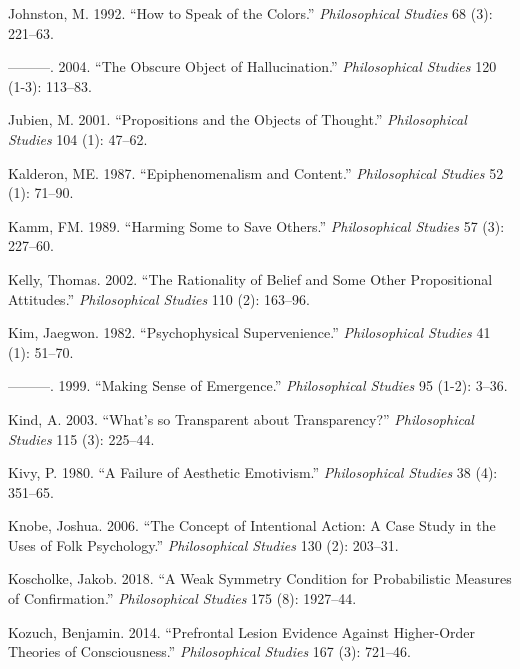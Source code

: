 \documentclass[
  10pt,
  letterpaper,
  DIV=11,
  numbers=noendperiod,
  twoside]{scrartcl}
\newlength{\cslhangindent}
\newenvironment{CSLReferences}[2] %
 {\begin{list}{}{%
  \setlength{\itemindent}{0pt}
  \setlength{\leftmargin}{0pt}
  \setlength{\parsep}{0pt}
  \ifodd #1
   \setlength{\leftmargin}{\cslhangindent}
   \setlength{\itemindent}{-1\cslhangindent}
  \fi
  \setlength{\itemsep}{#2\baselineskip}}}
 {\end{list}}
\begin{document}
\begin{CSLReferences}{1}{0}
Johnston, M. 1992. {``How to Speak of the Colors.''} \emph{Philosophical
Studies} 68 (3): 221--63.

---------. 2004. {``The Obscure Object of Hallucination.''}
\emph{Philosophical Studies} 120 (1-3): 113--83.

Jubien, M. 2001. {``Propositions and the Objects of Thought.''}
\emph{Philosophical Studies} 104 (1): 47--62.

Kalderon, ME. 1987. {``Epiphenomenalism and Content.''}
\emph{Philosophical Studies} 52 (1): 71--90.

Kamm, FM. 1989. {``Harming Some to Save Others.''} \emph{Philosophical
Studies} 57 (3): 227--60.

Kelly, Thomas. 2002. {``The Rationality of Belief and Some Other
Propositional Attitudes.''} \emph{Philosophical Studies} 110 (2):
163--96.

Kim, Jaegwon. 1982. {``Psychophysical Supervenience.''}
\emph{Philosophical Studies} 41 (1): 51--70.

---------. 1999. {``Making Sense of Emergence.''} \emph{Philosophical
Studies} 95 (1-2): 3--36.

Kind, A. 2003. {``What's so Transparent about Transparency?''}
\emph{Philosophical Studies} 115 (3): 225--44.

Kivy, P. 1980. {``A Failure of Aesthetic Emotivism.''}
\emph{Philosophical Studies} 38 (4): 351--65.

Knobe, Joshua. 2006. {``The Concept of Intentional Action: A Case Study
in the Uses of Folk Psychology.''} \emph{Philosophical Studies} 130 (2):
203--31.

Koscholke, Jakob. 2018. {``A Weak Symmetry Condition for Probabilistic
Measures of Confirmation.''} \emph{Philosophical Studies} 175 (8):
1927--44.

Kozuch, Benjamin. 2014. {``Prefrontal Lesion Evidence Against
Higher-Order Theories of Consciousness.''} \emph{Philosophical Studies}
167 (3): 721--46.


\end{CSLReferences}
\end{document}
